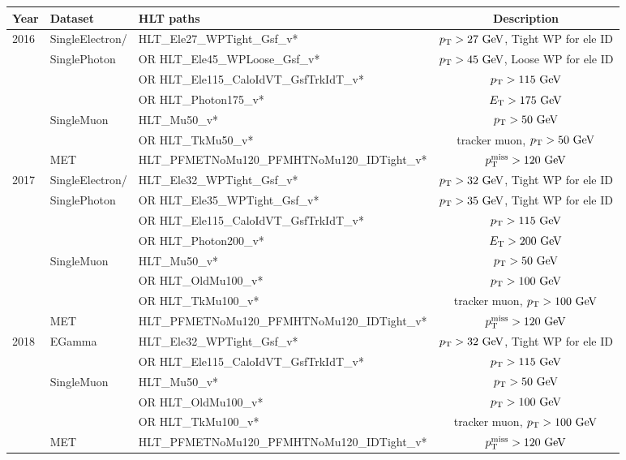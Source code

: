 \scriptsize
\begin{tabular}{l|l|l|c}
  \hline
  Year & Dataset & HLT paths & Description\\
  \hline
  \hline
  2016 & \ttfamily SingleElectron/ & \ttfamily HLT\_Ele27\_WPTight\_Gsf\_v* & $\pt>27\unit{GeV}$, Tight WP for ele ID \\
  & \ttfamily SinglePhoton & \ttfamily OR HLT\_Ele45\_WPLoose\_Gsf\_v* & $\pt>45\unit{GeV}$, Loose WP for ele ID \\
  && \ttfamily OR HLT\_Ele115\_CaloIdVT\_GsfTrkIdT\_v* & $\pt>115\unit{GeV}$ \\
  && \ttfamily OR HLT\_Photon175\_v* & $\Et>175\unit{GeV}$ \\
  \cline{2-4}
  & \ttfamily SingleMuon & \ttfamily HLT\_Mu50\_v* & $\pt>50\unit{GeV}$ \\
  && \ttfamily OR HLT\_TkMu50\_v* & tracker muon, $\pt>50\unit{GeV}$ \\
  \cline{2-4}
  & \ttfamily MET & \ttfamily HLT\_PFMETNoMu120\_PFMHTNoMu120\_IDTight\_v* & $\ptmiss>120\unit{GeV}$ \\
  \hline
  2017 & \ttfamily SingleElectron/& \ttfamily HLT\_Ele32\_WPTight\_Gsf\_v* & $\pt>32\unit{GeV}$, Tight WP for ele ID \\
  & \ttfamily SinglePhoton & \ttfamily OR HLT\_Ele35\_WPTight\_Gsf\_v* & $\pt>35\unit{GeV}$, Tight WP for ele ID \\
  && \ttfamily OR HLT\_Ele115\_CaloIdVT\_GsfTrkIdT\_v* & $\pt>115\unit{GeV}$ \\
  && \ttfamily OR HLT\_Photon200\_v* & $\Et>200\unit{GeV}$ \\
  \cline{2-4}
  & \ttfamily SingleMuon & \ttfamily HLT\_Mu50\_v* & $\pt>50\unit{GeV}$ \\
  && \ttfamily OR HLT\_OldMu100\_v* & $\pt>100\unit{GeV}$ \\
  && \ttfamily OR HLT\_TkMu100\_v* & tracker muon, $\pt>100\unit{GeV}$ \\
  \cline{2-4}
  & \ttfamily MET & \ttfamily HLT\_PFMETNoMu120\_PFMHTNoMu120\_IDTight\_v* & $\ptmiss>120\unit{GeV}$ \\
  \hline
  2018 & \ttfamily EGamma & \ttfamily HLT\_Ele32\_WPTight\_Gsf\_v* & $\pt>32\unit{GeV}$, Tight WP for ele ID \\
  && \ttfamily OR HLT\_Ele115\_CaloIdVT\_GsfTrkIdT\_v* & $\pt>115\unit{GeV}$ \\
  \cline{2-4}
  & \ttfamily SingleMuon & \ttfamily HLT\_Mu50\_v* & $\pt>50\unit{GeV}$ \\
  && \ttfamily OR HLT\_OldMu100\_v* & $\pt>100\unit{GeV}$ \\
  && \ttfamily OR HLT\_TkMu100\_v* & tracker muon, $\pt>100\unit{GeV}$ \\
  \cline{2-4}
  & \ttfamily MET & \ttfamily HLT\_PFMETNoMu120\_PFMHTNoMu120\_IDTight\_v* & $\ptmiss>120\unit{GeV}$ \\
  \hline
\end{tabular}
